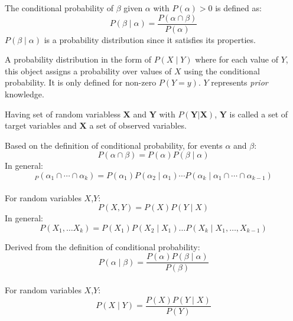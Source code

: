 {%
  The conditional probability of $\beta$ given $\alpha$ with $P(\alpha)>0$ is defined as:
  \begin{equation*}
    P(\beta\mid\alpha)=\frac{P(\alpha\cap\beta)}{P(\alpha)}
  \end{equation*}
  $P(\beta\mid\alpha)$ is a \gls{probability distribution} since it satisfies its properties.
}

{%
}

{%
  A \gls{probability distribution} in the form of $P(X\mid Y)$ where for each value of $Y$, this object assigns a probability over values of $X$ using the \gls{conditional probability}. It is only defined for non-zero $P(Y=y)$. $Y$ represents \textit{prior} knowledge.

  Having \glspl{set of random variables} $\bm{X}$ and $\bm{Y}$ with $P(\bm{Y}|\bm{X})$, $\bm{Y}$ is called a set of \glspl{target variable} and $\bm{X}$ a set of \glspl{observed variable}.
}

{%
  Based on the definition of \gls{conditional probability}, for events $\alpha$ and $\beta$:
  \begin{equation*}
    P(\alpha\cap\beta)=P(\alpha)P(\beta\mid\alpha)
  \end{equation*}
  In general:
  \begin{equation*}
    _P(\alpha_1\cap\cdots\cap\alpha_k)=P(\alpha_1)P(\alpha_2\mid\alpha_1)\cdots P(\alpha_k\mid\alpha_1\cap\cdots\cap\alpha_{k-1})
  \end{equation*}\\[0.1cm]
  For \glspl{random variable} $X$,$Y$:
  \begin{equation*}
    P(X,Y)=P(X)P(Y\mid X)
  \end{equation*}
  In general:
  \begin{equation*}
    P(X_1,\ldots X_k)=P(X_1)P(X_2\mid X_1)\ldots P(X_k\mid X_1,\ldots,X_{k-1})
  \end{equation*}

}

{%
  Derived from the definition of \gls{conditional probability}:
  \begin{equation*}
    P(\alpha\mid\beta)=\frac{P(\alpha)P(\beta\mid\alpha)}{P(\beta)}
  \end{equation*}\\[0.1cm]

  For \glspl{random variable} $X$,$Y$:
  \begin{equation*}
    P(X\mid Y)=\frac{P(X)P(Y\mid X)}{P(Y)}
  \end{equation*}
}


